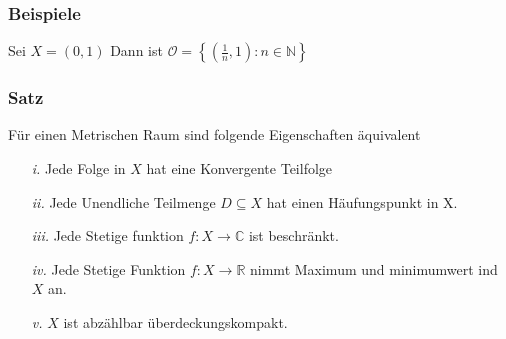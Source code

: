 \documentclass{article}
\newcommand{\satz}[1]{\subsubsection*{Satz {#1}}}
\newcommand{\beispiel}[1]{\subsubsection*{Beispiele {#1}}}
\begin{document}
\beispiel{} Sei $X=(0,1)$ Dann ist $\mathcal{O}=\left\lbrace(\frac{1}{n},1):n\in \mathbb{N}\right\rbrace$ 
\satz{}
Für einen Metrischen Raum sind folgende Eigenschaften äquivalent
\begin{itemize}
\item[\textit{i.}]{ Jede Folge in $X$ hat eine Konvergente Teilfolge} %
\item[\textit{ii.}]{Jede Unendliche Teilmenge $D\subseteq X$ hat einen Häufungspunkt in X.} %
\item[\textit{iii.}]{Jede Stetige funktion $f:X \rightarrow \mathbb{C }$ ist beschränkt.} %
\item[\textit{iv.}]{Jede Stetige Funktion $f: X \rightarrow \mathbb{R}$ nimmt Maximum und minimumwert ind $X$ an.} %
\item[\textit{v.}]{$X$ ist abzählbar überdeckungskompakt.} %
\end{itemize}
\end{document}
